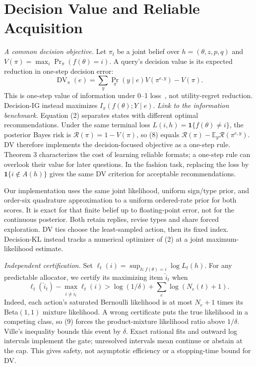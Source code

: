 \documentclass[sigconf,anonymous,review]{acmart}
\begin{document}
\section{Decision Value and Reliable Acquisition}
\emph{A common decision objective.} Let $\pi_t$ be a joint belief over $h=(\theta,z,p,q)$ and $V(\pi)=\max_i\Pr_\pi(f(\theta)=i)$. A query's decision value is its expected reduction in one-step decision error:
\begin{equation}\operatorname{DV}_\pi(e)=\sum_y\Pr_\pi(y\mid e)V(\pi^{e,y})-V(\pi).\end{equation}
This is one-step value of information under 0--1 loss~\cite{r1}, not utility-regret reduction. Decision-IG instead maximizes $I_\pi(f(\theta);Y\mid e)$.
\emph{Link to the information benchmark.} Equation (2) separates states with different optimal recommendations. Under the same terminal loss $L(i,h)=\mathbf 1\{f(\theta)\ne i\}$, the posterior Bayes risk is $\mathcal R(\pi)=1-V(\pi)$, so (8) equals $\mathcal R(\pi)-\mathbb E_y\mathcal R(\pi^{e,y})$. DV therefore implements the decision-focused objective as a one-step rule. Theorem 3 characterizes the cost of learning reliable formats; a one-step rule can overlook their value for later questions. In the fashion task, replacing the loss by $\mathbf 1\{i\notin A(h)\}$ gives the same DV criterion for acceptable recommendations.

Our implementation uses the same joint likelihood, uniform sign/type prior, and order-six quadrature approximation to a uniform ordered-rate prior for both scores. It is exact for that finite belief up to floating-point error, not for the continuous posterior. Both retain replies, revise types and share forced exploration. DV ties choose the least-sampled action, then its fixed index. Decision-KL instead tracks a numerical optimizer of (2) at a joint maximum-likelihood estimate.

\emph{Independent certification.} Set $\ell_t(i)=\sup_{h:f(\theta)=i}\log L_t(h)$. For any predictable allocator, we certify its maximizing item $\hat i_t$ when
\begin{equation}\ell_t(\hat i_t)-\max_{i\ne\hat i_t}\ell_t(i)>\log(1/\delta)+\sum_e\log(N_e(t)+1).\end{equation}
Indeed, each action's saturated Bernoulli likelihood is at most $N_e+1$ times its Beta$(1,1)$ mixture likelihood. A wrong certificate puts the true likelihood in a competing class, so (9) forces the product-mixture likelihood ratio above $1/\delta$. Ville's inequality bounds this event by $\delta$. Exact rational fits and outward log intervals implement the gate; unresolved intervals mean continue or abstain at the cap. This gives safety, not asymptotic efficiency or a stopping-time bound for DV.
\end{document}
